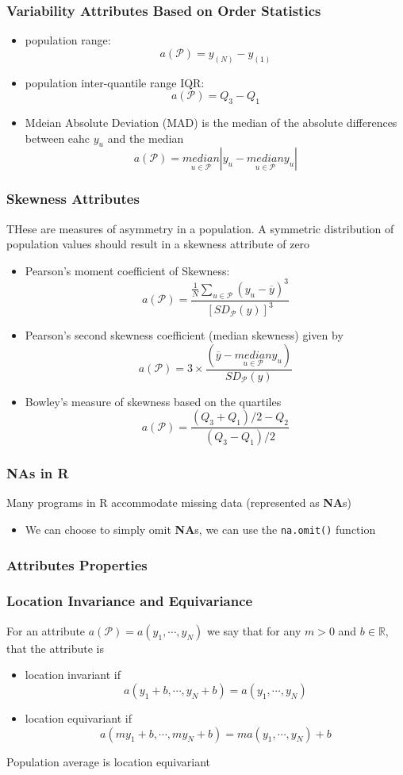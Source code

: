 \documentclass[11pt]{article}
\newcommand{\R}{{\mathbb{R}}}
\begin{document}
\subsubsection*{Variability Attributes Based on Order Statistics}
\begin{itemize}
    \item population range: \[a(\mathcal{P})=y_{(N)}-y_{(1)}\]
    \item population inter-quantile range IQR: \[a(\mathcal{P})=Q_3-Q_1\]
    \item Mdeian Absolute Deviation (MAD) is the median of the absolute differences between eahc $y_u$ and the median \[a(\mathcal{P}) = \underset{u\in\mathcal{P}}{median}|y_u-\underset{u\in\mathcal{P}}{median}y_u|\]
\end{itemize}
\subsubsection*{Skewness Attributes}
THese are measures of asymmetry in a population. A symmetric distribution of population values should result in a skewness attribute of zero
\begin{itemize}
    \item Pearson's moment coefficient of Skewness: \[a(\mathcal{P}) = \frac{\frac{1}{N}\sum_{u\in\mathcal{P}}(y_u-\overline{y})^3}{[SD_\mathcal{P}(y)]^3}\]    
    \item Pearson's second skewness coefficient (median skewness) given by \[a(\mathcal{P}) = 3\times\frac{(\overline{y}-\underset{u\in\mathcal{P}}{median}y_u)}{SD_\mathcal{P}(y)}\]
    \item Bowley's measure of skewness based on the quartiles \[a(\mathcal{P}) = \frac{(Q_3+Q_1)/2-Q_2}{(Q_3-Q_1)/2}\]
\end{itemize}
\subsubsection*{NAs in R}
Many programs in R accommodate missing data (represented as \textbf{NA}s) 
\begin{itemize}
    \item We can choose to simply omit \textbf{NA}s, we can use the \texttt{na.omit()} function 
\end{itemize}
\subsubsection{Attributes Properties}
\subsubsection*{Location Invariance and Equivariance}
For an attribute $a(\mathcal{P}) = a(y_1,\cdots,y_N)$ we say that for any $m>0$ and $b\in\R$, that the attribute is 
\begin{itemize}
    \item location invariant if \[a(y_1+b,\cdots,y_N+b)=a(y_1,\cdots,y_N)\]
    \item location equivariant if \[a(my_1+b,\cdots,my_N+b)=ma(y_1,\cdots,y_N)+b\]
\end{itemize} 
Population average is location equivariant 
\end{document}
